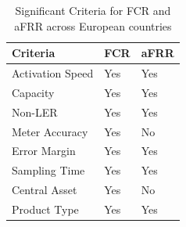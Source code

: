 \begin{table}[ht]
    \centering
    \begin{tabularx}{\textwidth}{|>{\raggedright\arraybackslash}X|>{\centering\arraybackslash}p{2cm}|>{\centering\arraybackslash}p{2cm}|}
        \hline
        \textbf{Criteria} & \textbf{FCR} & \textbf{aFRR} \\
        \hline
        Activation Speed & Yes & Yes \\
        \hline
        Capacity & Yes & Yes \\
        \hline
        Non-LER & Yes & Yes \\
        \hline
        Meter Accuracy & Yes & No \\
        \hline
        Error Margin & Yes & Yes \\
        \hline
        Sampling Time & Yes & Yes \\
        \hline
        Central Asset & Yes & No \\
        \hline
        Product Type & Yes & Yes \\
        \hline       
    \end{tabularx}
    \caption{Significant Criteria for FCR and aFRR across European countries}
    \label{tab:criteria2}
\end{table}



